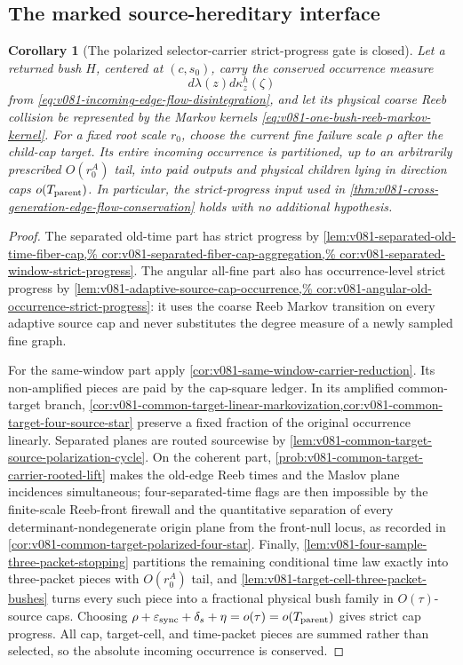 \documentclass[10pt]{article}
\newtheorem{corollary}[theorem]{Corollary}
\begin{document}
\subsection{The marked source-hereditary interface}

\begin{corollary}[The polarized selector-carrier strict-progress gate is closed]
\label{prob:v081-strict-progress-edge-flow-gate}
Let a returned bush \(H\), centered at \((c,s_0)\), carry the conserved occurrence measure
\[
d\lambda(z)d\kappa_z^h(\zeta)
\]
from \eqref{eq:v081-incoming-edge-flow-disintegration}, and let its physical coarse Reeb collision
be represented by the Markov kernels
\eqref{eq:v081-one-bush-reeb-markov-kernel}.  For a fixed root scale \(r_0\), choose the current
fine failure scale \(\rho\) after the child-cap target.  Its entire incoming occurrence is
partitioned, up to an arbitrarily prescribed \(O(r_0^A)\) tail, into paid outputs and physical children lying in
direction caps \(o(T_{\rm parent})\).  In particular, the strict-progress input used in
\cref{thm:v081-cross-generation-edge-flow-conservation} holds with no additional hypothesis.
\end{corollary}

\begin{proof}
The separated old-time part has strict progress by
\cref{lem:v081-separated-old-time-fiber-cap,%
cor:v081-separated-fiber-cap-aggregation,%
cor:v081-separated-window-strict-progress}.  The angular all-fine part also has occurrence-level
strict progress by
\cref{lem:v081-adaptive-source-cap-occurrence,%
cor:v081-angular-old-occurrence-strict-progress}: it uses the coarse Reeb Markov transition on
every adaptive source cap and never substitutes the degree measure of a newly sampled fine graph.

For the same-window part apply \cref{cor:v081-same-window-carrier-reduction}.  Its non-amplified
pieces are paid by the cap-square ledger.  In its amplified common-target branch,
\cref{cor:v081-common-target-linear-markovization,cor:v081-common-target-four-source-star} preserve
a fixed fraction of the original occurrence linearly.  Separated planes are routed sourcewise by
\cref{lem:v081-common-target-source-polarization-cycle}.  On the coherent part,
\cref{prob:v081-common-target-carrier-rooted-lift} makes the old-edge Reeb times and the Maslov
plane incidences simultaneous;
four-separated-time flags are then impossible by the finite-scale Reeb-front firewall and the
quantitative separation of every determinant-nondegenerate origin plane from the front-null locus,
as recorded in \cref{cor:v081-common-target-polarized-four-star}.  Finally,
\cref{lem:v081-four-sample-three-packet-stopping} partitions the remaining conditional time law
exactly into three-packet pieces with \(O(r_0^A)\) tail, and
\cref{lem:v081-target-cell-three-packet-bushes} turns every such piece into a fractional physical
bush family in \(O(\tau)\)-source caps.  Choosing
\(\rho+\varepsilon_{\rm sync}+\delta_s+\eta=o(\tau)=o(T_{\rm parent})\) gives strict cap progress.  All cap, target-cell, and
time-packet pieces are summed rather than selected, so the absolute incoming occurrence is
conserved.
\end{proof}
\end{document}
